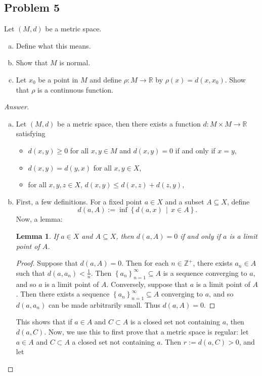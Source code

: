 \documentclass[12pt]{article}
\newcommand{\z}{\mathbb{Z}}
\newcommand{\real}{\mathbb{R}}
\newcommand\paren[1]{\left( #1 \right)}
\newcommand\setb[1]{\left \{ #1 \right \}}
\newtheorem{lemma}[theorem]{Lemma}
\theoremstyle{definition}
\begin{document}
\subsection{Problem 5 \texorpdfstring{\cite{Munkres}}{}}
Let $(M,d)$ be a metric space.
\begin{enumerate}[(a)]
    \item Define what this means.
    \item Show that $M$ is normal.
    \item Let $x_0$ be a point in $M$ and define $\rho : M \to \real$ by $\rho(x) = d \paren{ x , x_0 }$. Show that $\rho$ is a continuous function.
\end{enumerate}
\begin{proof}[Answer]
    \noindent
    \begin{enumerate}[(a)]
        \item Let $(M,d)$ be a metric space, then there exists a function $d : M \times M \to \real$ satisfying
        \begin{itemize}
            \item $d(x,y) \geq 0$ for all $x , y \in M$ and $d(x,y) = 0$ if and only if $x = y$,
            \item $d(x,y) = d(y,x)$ for all $x , y \in X$,
            \item for all $x ,y , z\in X$, $d(x,y) \leq d(x,z) + d(z,y)$,
        \end{itemize}
        \item First, a few definitions. For a fixed point $a \in X$ and a subset $A \subseteq X$, define
        \[
            d(a,A) := \inf \setb{ d(a,x) \, \middle| \, x \in A }.
        \]
        Now, a lemma:
        \begin{lemma}
            If $a \in X$ and $A \subseteq X$, then $d(a,A) = 0$ if and only if $a$ is a limit point of $A$.
        \end{lemma}
        \begin{proof}
            Suppose that $d(a,A) = 0$. Then for each $n \in \z^+$, there exists $a_n \in A$ such that $d \paren{ a , a_n } < \frac{1}{n}$. Then $\setb{ a_n }_{n = 1}^{\infty} \subseteq A$ is a sequence converging to $a$, and so $a$ is a limit point of $A$. Conversely, suppose that $a$ is a limit point of $A$. Then there exists a sequence $\setb{ a_n }_{n = 1}^{\infty} \subseteq A$ converging to $a$, and so $d \paren{ a , a_n }$ can be made arbitrarily small. Thus $d(a,A) = 0$.
        \end{proof}
        This shows that if $a \in A$ and $C \subset A$ is a closed set not containing $a$, then $d(a,C)$. Now, we use this to first prove that a metric space is regular: let $a \in A$ and $C \subset A$ a closed set not containing $a$. Then $r := d(a,C) > 0$, and let 

\end{enumerate}
\end{proof}
\end{document}

